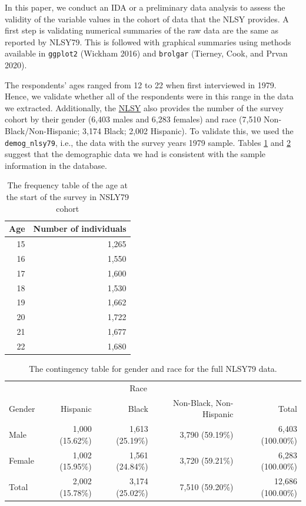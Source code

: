 \documentclass{article}
\begin{document}
In this paper, we conduct an IDA or a preliminary data analysis to assess the validity of the variable values in the cohort of data that the NLSY provides. A first step is validating numerical summaries of the raw data are the same as reported by NLSY79. This is followed with graphical summaries using methods available in \texttt{ggplot2} (Wickham 2016) and \texttt{brolgar} (Tierney, Cook, and Prvan 2020).

The respondents' ages ranged from 12 to 22 when first interviewed in 1979. Hence, we validate whether all of the respondents were in this range in the data we extracted. Additionally, the \href{https://www.nlsinfo.org/content/cohorts/nlsy79/intro-to-the-sample/nlsy79-sample-introduction}{NLSY} also provides the number of the survey cohort by their gender (6,403 males and 6,283 females) and race (7,510 Non-Black/Non-Hispanic; 3,174 Black; 2,002 Hispanic). To validate this, we used the \texttt{demog\_nlsy79}, i.e., the data with the survey years 1979 sample. Tables \ref{tab:age-table} and \ref{tab:gender-race-table} suggest that the demographic data we had is consistent with the sample information in the database.

\begin{table}

\caption{\label{tab:age-table}The frequency table of the age at the start of the survey in NSLY79 cohort}
\centering
\begin{tabular}[t]{rr}
\toprule
Age & Number of individuals\\
\midrule
15 & 1,265\\
16 & 1,550\\
17 & 1,600\\
18 & 1,530\\
19 & 1,662\\
20 & 1,722\\
21 & 1,677\\
22 & 1,680\\
\bottomrule
\end{tabular}
\end{table}

\begin{table}

\caption{\label{tab:gender-race-table}The contingency table for gender and race for the full NLSY79 data.}
\centering
\begin{tabular}[t]{lrrrr}
\toprule
\multicolumn{1}{c}{ } & \multicolumn{3}{c}{Race} & \multicolumn{1}{c}{ } \\
\cmidrule(l{3pt}r{3pt}){2-4}
Gender & Hispanic & Black & Non-Black, Non-Hispanic & Total\\
\midrule
Male & 1,000 (15.62\%) & 1,613 (25.19\%) & 3,790 (59.19\%) & 6,403 (100.00\%)\\
Female & 1,002 (15.95\%) & 1,561 (24.84\%) & 3,720 (59.21\%) & 6,283 (100.00\%)\\
\midrule
Total & 2,002 (15.78\%) & 3,174 (25.02\%) & 7,510 (59.20\%) & 12,686 (100.00\%)\\
\bottomrule
\end{tabular}
\end{table}
\end{document}
